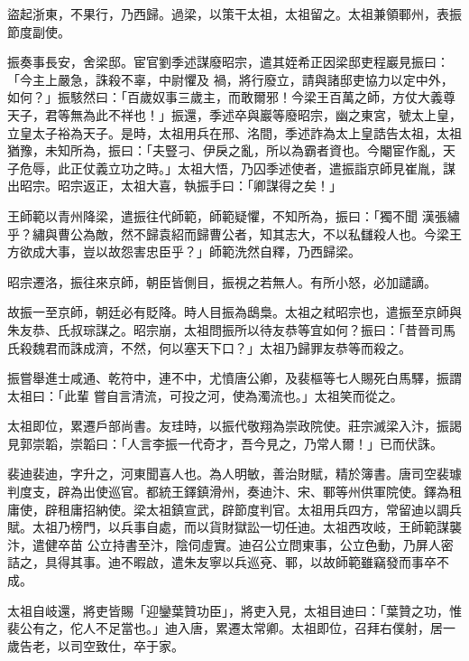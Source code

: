 \begin{pinyinscope}
 盜起浙東，不果行，乃西歸。過梁，以策干太祖，太祖留之。太祖兼領鄆州，表振節度副使。



 振奏事長安，舍梁邸。宦官劉季述謀廢昭宗，遣其姪希正因梁邸吏程巖見振曰：「今主上嚴急，誅殺不辜，中尉懼及
 禍，將行廢立，請與諸邸吏協力以定中外，如何？」振駭然曰：「百歲奴事三歲主，而敢爾邪！今梁王百萬之師，方仗大義尊天子，君等無為此不祥也！」振還，季述卒與巖等廢昭宗，幽之東宮，號太上皇，立皇太子裕為天子。是時，太祖用兵在邢、洺間，季述詐為太上皇誥告太祖，太祖猶豫，未知所為，振曰：「夫豎刁、伊戾之亂，所以為霸者資也。今閹宦作亂，天子危辱，此正仗義立功之時。」太祖大悟，乃囚季述使者，遣振詣京師見崔胤，謀出昭宗。昭宗返正，太祖大喜，執振手曰：「卿謀得之矣！」



 王師範以青州降梁，遣振往代師範，師範疑懼，不知所為，振曰：「獨不聞
 漢張繡乎？繡與曹公為敵，然不歸袁紹而歸曹公者，知其志大，不以私讎殺人也。今梁王方欲成大事，豈以故怨害忠臣乎？」師範洗然自釋，乃西歸梁。



 昭宗遷洛，振往來京師，朝臣皆側目，振視之若無人。有所小怒，必加譴謫。



 故振一至京師，朝廷必有貶降。時人目振為鴟梟。太祖之弒昭宗也，遣振至京師與朱友恭、氏叔琮謀之。昭宗崩，太祖問振所以待友恭等宜如何？振曰：「昔晉司馬氏殺魏君而誅成濟，不然，何以塞天下口？」太祖乃歸罪友恭等而殺之。



 振嘗舉進士咸通、乾符中，連不中，尤憤唐公卿，及裴樞等七人賜死白馬驛，振謂太祖曰：「此輩
 嘗自言清流，可投之河，使為濁流也。」太祖笑而從之。



 太祖即位，累遷戶部尚書。友珪時，以振代敬翔為崇政院使。莊宗滅梁入汴，振謁見郭崇韜，崇韜曰：「人言李振一代奇才，吾今見之，乃常人爾！」已而伏誅。



 裴迪裴迪，字升之，河東聞喜人也。為人明敏，善治財賦，精於簿書。唐司空裴璩判度支，辟為出使巡官。都統王鐸鎮滑州，奏迪汴、宋、鄆等州供軍院使。鐸為租庸使，辟租庸招納使。梁太祖鎮宣武，辟節度判官。太祖用兵四方，常留迪以調兵賦。太祖乃榜門，以兵事自處，而以貨財獄訟一切任迪。太祖西攻岐，王師範謀襲汴，遣健卒苗
 公立持書至汴，陰伺虛實。迪召公立問東事，公立色動，乃屏人密詰之，具得其事。迪不暇啟，遣朱友寧以兵巡兗、鄆，以故師範雖竊發而事卒不成。



 太祖自岐還，將吏皆賜「迎鑾葉贊功臣」，將吏入見，太祖目迪曰：「葉贊之功，惟裴公有之，佗人不足當也。」迪入唐，累遷太常卿。太祖即位，召拜右僕射，居一歲告老，以司空致仕，卒于家。




\end{pinyinscope}
